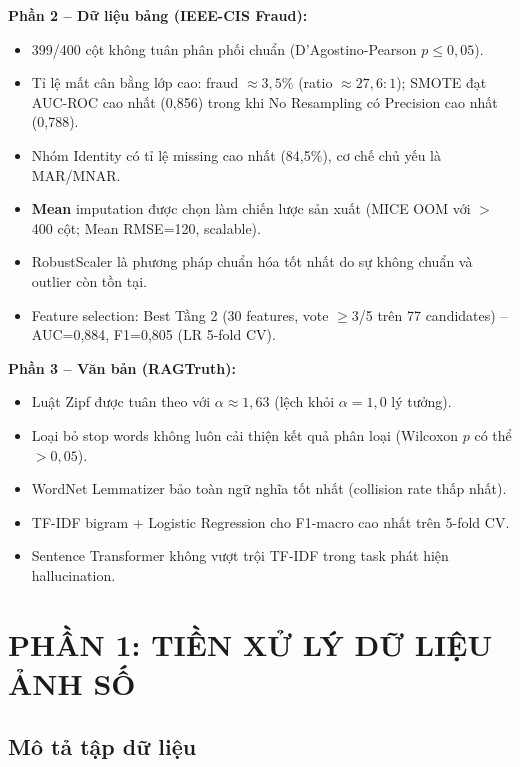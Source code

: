 \documentclass[12pt,a4paper]{article}
\let\oldtextbf\textbf
\renewcommand{\textbf}[1]{\oldtextbf{\textcolor{hcmublue}{#1}}}
\begin{document}
\textbf{Phần 2 -- Dữ liệu bảng (IEEE-CIS Fraud):}
\begin{itemize}
    \item 399/400 cột không tuân phân phối chuẩn (D'Agostino-Pearson $p \leq 0{,}05$).
    \item Tỉ lệ mất cân bằng lớp cao: fraud $\approx 3{,}5\%$ (ratio $\approx 27{,}6:1$); SMOTE đạt AUC-ROC cao nhất (0{,}856) trong khi No Resampling có Precision cao nhất (0{,}788).
    \item Nhóm Identity có tỉ lệ missing cao nhất (84,5\%), cơ chế chủ yếu là MAR/MNAR.
    \item \textbf{Mean} imputation được chọn làm chiến lược sản xuất (MICE OOM với $>$400 cột; Mean RMSE=120, scalable).
    \item RobustScaler là phương pháp chuẩn hóa tốt nhất do sự không chuẩn và outlier còn tồn tại.
    \item Feature selection: Best Tầng 2 (30 features, vote $\geq$3/5 trên 77 candidates) -- AUC=0{,}884, F1=0{,}805 (LR 5-fold CV).
\end{itemize}

\textbf{Phần 3 -- Văn bản (RAGTruth):}
\begin{itemize}
    \item Luật Zipf được tuân theo với $\alpha \approx 1{,}63$ (lệch khỏi $\alpha = 1{,}0$ lý tưởng).
    \item Loại bỏ stop words không luôn cải thiện kết quả phân loại (Wilcoxon $p$ có thể $> 0{,}05$).
    \item WordNet Lemmatizer bảo toàn ngữ nghĩa tốt nhất (collision rate thấp nhất).
    \item TF-IDF bigram + Logistic Regression cho F1-macro cao nhất trên 5-fold CV.
    \item Sentence Transformer không vượt trội TF-IDF trong task phát hiện hallucination.
\end{itemize}

\section{PHẦN 1: TIỀN XỬ LÝ DỮ LIỆU ẢNH SỐ}

\subsection{Mô tả tập dữ liệu}
\end{document}
